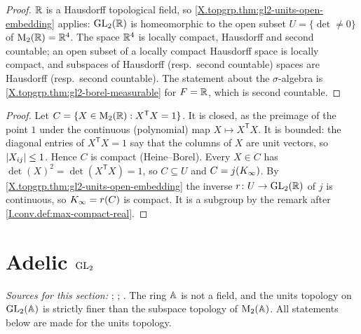 \begin{theorem}
\end{theorem}
\begin{proof}
$\mathbb{R}$ is a Hausdorff topological field, so \cref{X.topgrp.thm:gl2-units-open-embedding} applies: $\mathrm{GL}_2(\mathbb{R})$ is
homeomorphic to the open subset $U=\{\det\neq0\}$ of $\mathrm{M}_2(\mathbb{R})=\mathbb{R}^4$. The space $\mathbb{R}^4$ is locally compact,
Hausdorff and second countable; an open subset of a locally compact Hausdorff space is locally compact, and
subspaces of Hausdorff (resp.\ second countable) spaces are Hausdorff (resp.\ second countable). The statement about
the $\sigma$-algebra is \cref{X.topgrp.thm:gl2-borel-measurable} for $F=\mathbb{R}$, which is second countable.
\end{proof}

\begin{theorem}
\end{theorem}
\begin{proof}
Let $C=\{X\in\mathrm{M}_2(\mathbb{R}):X^{\mathsf T}X=1\}$. It is closed, as the preimage of the point $1$ under the continuous
(polynomial) map $X\mapsto X^{\mathsf T}X$. It is bounded: the diagonal entries of $X^{\mathsf T}X=1$ say that the columns of
$X$ are unit vectors, so $\lvert X_{ij}\rvert\le1$. Hence $C$ is compact (Heine--Borel). Every $X\in C$ has
$\det(X)^2=\det(X^{\mathsf T}X)=1$, so $C\subseteq U$ and $C=j(K_\infty)$. By \cref{X.topgrp.thm:gl2-units-open-embedding}
the inverse $r\colon U\to\mathrm{GL}_2(\mathbb{R})$ of $j$ is continuous, so $K_\infty=r(C)$ is compact. It is a subgroup by the remark
after \cref{I.conv.def:max-compact-real}.
\end{proof}

\section{\texorpdfstring{Adelic $\mathrm{GL}_2$}{Adelic GL₂}}\label{sec:topgrp-adelic}

\noindent\emph{Sources for this section:} \cite[§§4.3--4.4]{GH}; \cite[§2]{AIntro}; \cite{Bor-fin}. The ring $\mathbb{A}$ is not
a field, and the units topology on $\mathrm{GL}_2(\mathbb{A})$ is strictly finer than the subspace topology of $\mathrm{M}_2(\mathbb{A})$. All
statements below are made for the units topology.

